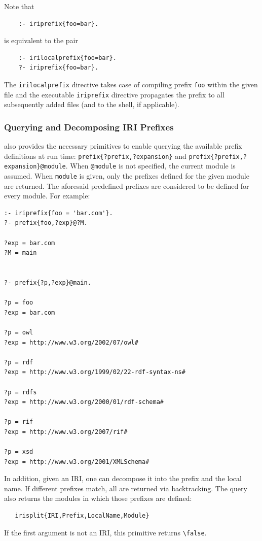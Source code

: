 \documentclass[11pt]{article}
\newcommand{\ERGO}{\mbox{\smaller{\ensuremath{\cal{E}}\smaller{{\sc{RGO}}}}}\xspace}
\newcommand{\FLSYSTEM}{\ERGO}
\newcommand{\bs}{\textbackslash}
\begin{document}
Note that
\begin{verbatim}
    :- iriprefix{foo=bar}.
\end{verbatim}
is equivalent to the pair
\begin{verbatim}
    :- irilocalprefix{foo=bar}.
    ?- iriprefix{foo=bar}.
\end{verbatim}
The \texttt{irilocalprefix} directive  takes case of compiling prefix
\texttt{foo} within the given file and the executable \texttt{iriprefix}   
directive propagates the prefix to all subsequently added files (and to the
\FLSYSTEM shell, if applicable).

\subsubsection{Querying and Decomposing IRI Prefixes}

\FLSYSTEM also provides the necessary primitives to enable querying the
available prefix definitions at run time:
\texttt{prefix\{?prefix,?expansion\}} and
\texttt{prefix\{?prefix,?expansion\}@module}.
When {\tt @module}  is not
specified, the current module is assumed. When {\tt module} is given,
only the prefixes defined for the given module are returned. The
aforesaid predefined prefixes are considered to be defined for every
module. For example:
\begin{verbatim}
:- iriprefix{foo = 'bar.com'}.
?- prefix{foo,?exp}@?M.

?exp = bar.com
?M = main


?- prefix{?p,?exp}@main.

?p = foo
?exp = bar.com

?p = owl
?exp = http://www.w3.org/2002/07/owl#

?p = rdf
?exp = http://www.w3.org/1999/02/22-rdf-syntax-ns#

?p = rdfs
?exp = http://www.w3.org/2000/01/rdf-schema#

?p = rif
?exp = http://www.w3.org/2007/rif#

?p = xsd
?exp = http://www.w3.org/2001/XMLSchema#
\end{verbatim}

In addition, given an IRI, one can decompose it into the prefix and the
local name. If different prefixes match, all are returned via backtracking.
The query also returns the modules in which those prefixes are defined:
\begin{verbatim}
   irisplit{IRI,Prefix,LocalName,Module}
\end{verbatim}
If the first argument is not an IRI, this primitive returns
\texttt{\bs{}false}.
\end{document}
